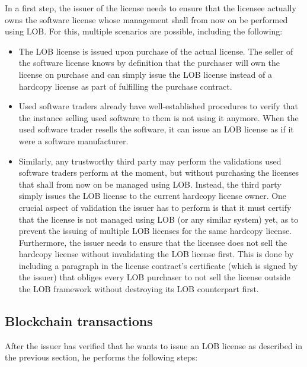 \documentclass[a4paper]{article}
\begin{document}
In a first step, the issuer of the license needs to ensure that the licensee actually owns the software license whose management shall from now on be performed using LOB. For this, multiple scenarios are possible, including the following:
\begin{itemize}
  \item The LOB license is issued upon purchase of the actual license. The seller of the software license knows by definition that the purchaser will own the license on purchase and can simply issue the LOB license instead of a hardcopy license as part of fulfilling the purchase contract.

  \item Used software traders already have well-established procedures to verify that the instance selling used software to them is not using it anymore. When the used software trader resells the software, it can issue an LOB license as if it were a software manufacturer.

  \item Similarly, any trustworthy third party may perform the validations used software traders perform at the moment, but without purchasing the licenses that shall from now on be managed using LOB. Instead, the third party simply issues the LOB license to the current hardcopy license owner. One crucial aspect of validation the issuer has to perform is that it must certify that the license is not managed using LOB (or any similar system) yet, as to prevent the issuing of multiple LOB licenses for the same hardcopy license. Furthermore, the issuer needs to ensure that the licensee does not sell the hardcopy license without invalidating the LOB license first. This is done by including a paragraph in the license contract's certificate (which is signed by the issuer) that obliges every LOB purchaser to not sell the license outside the LOB framework without destroying its LOB counterpart first.
\end{itemize}

\subsection{Blockchain transactions}

After the issuer has verified that he wants to issue an LOB license as described in the previous section, he performs the following steps:
\end{document}

